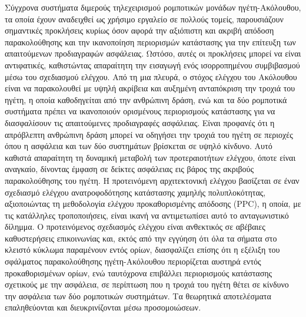 \documentclass[
12pt, %
twoside, %
openright,
english,
headsepline, %
]{MastersDoctoralThesis} %
\theoremstyle{underline}
\begin{document}

\mbox{}
\thispagestyle{empty}
\newpage


\begin{summary}
	Σύγχρονα συστήματα διμερούς τηλεχειρισμού ρομποτικών μονάδων ηγέτη-Ακόλουθου, τα οποία έχουν αναδειχθεί ως χρήσιμο εργαλείο σε πολλούς τομείς, παρουσιάζουν σημαντικές προκλήσεις κυρίως όσον αφορά την αξιόπιστη και ακριβή απόδοση παρακολούθησης και την ικανοποίηση περιορισμών κατάστασης για την επίτευξη των απαιτούμενων προδιαγραφών ασφάλειας. Ωστόσο, αυτές οι προκλήσεις μπορεί να είναι αντιφατικές, καθιστώντας απαραίτητη την εισαγωγή ενός ισορροπημένου συμβιβασμού μέσω του σχεδιασμού ελέγχου. Από τη μια πλευρά, ο στόχος ελέγχου του Ακόλουθου είναι να παρακολουθεί με υψηλή ακρίβεια και αυξημένη ανταπόκριση την τροχιά του ηγέτη, η οποία καθοδηγείται από την ανθρώπινη δράση, ενώ και τα δύο ρομποτικά συστήματα πρέπει να ικανοποιούν ορισμένους περιορισμούς κατάστασης για να διασφαλίσουν τις απαιτούμενες προδιαγραφές ασφάλειας. Είναι προφανές ότι η απρόβλεπτη ανθρώπινη δράση μπορεί να οδηγήσει την τροχιά του ηγέτη σε περιοχές όπου η ασφάλεια και των δύο συστημάτων βρίσκεται σε υψηλό κίνδυνο. Αυτό καθιστά απαραίτητη τη δυναμική μεταβολή των προτεραιοτήτων ελέγχου, όποτε είναι αναγκαίο, δίνοντας έμφαση σε δείκτες ασφάλειας εις βάρος της ακριβούς παρακολούθησης του ηγέτη. Η προτεινόμενη αρχιτεκτονική ελέγχου βασίζεται σε έναν σχεδιασμό ελέγχου ανατροφοδότησης κατάστασης χαμηλής πολυπλοκότητας, αξιοποιώντας τη μεθοδολογία ελέγχου προκαθορισμένης απόδοσης (PPC), η οποία, με τις κατάλληλες τροποποιήσεις, είναι ικανή να αντιμετωπίσει αυτό το ανταγωνιστικό δίλημμα. Ο προτεινόμενος σχεδιασμός ελέγχου είναι ανθεκτικός σε αβέβαιες καθυστερήσεις επικοινωνίας και, εκτός από την εγγύηση ότι όλα τα σήματα στο κλειστό κύκλωμα παραμένουν εντός ορίων, διασφαλίζει επίσης ότι η εξέλιξη του σφάλματος παρακολούθησης ηγέτη-Ακόλουθου περιορίζεται αυστηρά εντός προκαθορισμένων ορίων, ενώ ταυτόχρονα επιβάλλει περιορισμούς κατάστασης σχετικούς με την ασφάλεια, σε περίπτωση που η τροχιά του ηγέτη θέτει σε κίνδυνο την ασφάλεια των δύο ρομποτικών συστημάτων. Τα θεωρητικά αποτελέσματα επαληθεύονται και διευκρινίζονται μέσω προσομοιώσεων.
	
	
	
	
	\bigskip
	\end{summary}
	
\end{document}

